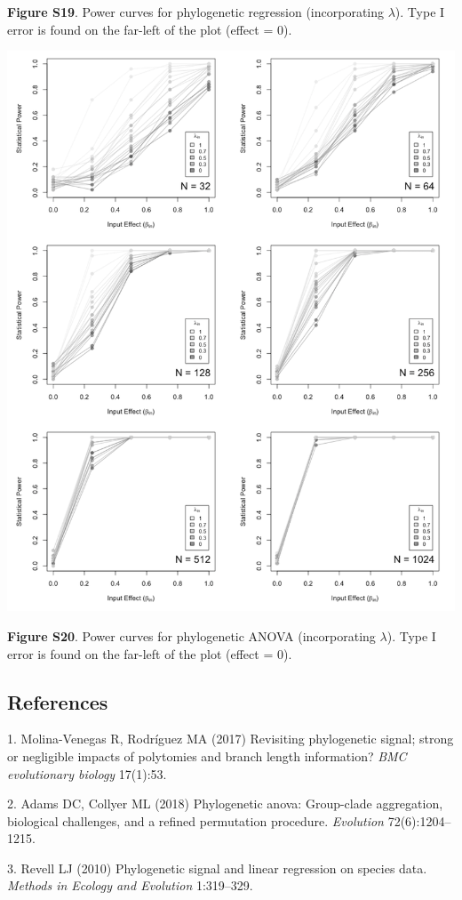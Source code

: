 \documentclass[
]{article}
\begin{document}
\textbf{Figure S19}. Power curves for phylogenetic regression
(incorporating \(\lambda\)). Type I error is found on the far-left of
the plot (effect = 0).

\includegraphics[width=0.95\linewidth]{fig.S20}

\textbf{Figure S20}. Power curves for phylogenetic ANOVA (incorporating
\(\lambda\)). Type I error is found on the far-left of the plot (effect
= 0).

\newpage

\hypertarget{references}{%
\subsection*{References}\label{references}}

\hypertarget{refs}{}
\leavevmode\hypertarget{ref-MolinaVenegas2017}{}%
1. Molina-Venegas R, Rodríguez MA (2017) Revisiting phylogenetic signal;
strong or negligible impacts of polytomies and branch length
information? \emph{BMC evolutionary biology} 17(1):53.

\leavevmode\hypertarget{ref-AdamsCollyer2018b}{}%
2. Adams DC, Collyer ML (2018) Phylogenetic anova: Group-clade
aggregation, biological challenges, and a refined permutation procedure.
\emph{Evolution} 72(6):1204--1215.

\leavevmode\hypertarget{ref-Revell2010}{}%
3. Revell LJ (2010) Phylogenetic signal and linear regression on species
data. \emph{Methods in Ecology and Evolution} 1:319--329.
\end{document}
